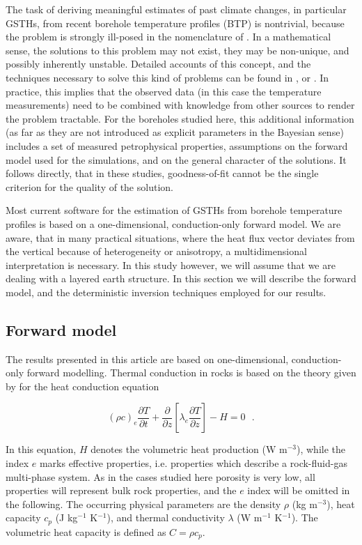\documentclass[cp]{copernicus}
\begin{document}
The task of deriving meaningful estimates of past climate changes, in particular GSTHs, from recent 
borehole temperature profiles (BTP) is nontrivial, because the problem is strongly ill-posed in the 
nomenclature of \citet{Hadamard1923a}. In a mathematical sense, the solutions to this problem may 
not exist, they may be non-unique, and possibly inherently unstable. Detailed accounts of this 
concept, and the techniques necessary to solve this kind of problems can be found in 
\citep{Hansen1998a, Hansen2010a}, or \citep{Aster2019a}. In practice, this implies that the 
observed data (in this case the temperature measurements) need to be combined with knowledge from 
other sources to render the problem tractable. For the boreholes studied here, this additional 
information (as far as they are not introduced as explicit parameters in the Bayesian sense) 
includes a set of measured petrophysical properties, assumptions on the forward model used for the 
simulations, and on the general character of the solutions. It follows directly, that in these 
studies, goodness-of-fit cannot be the single criterion for the quality of the solution. 

Most current software for the estimation of GSTHs from borehole temperature profiles is based on a 
one-dimensional, conduction-only forward model. We are aware, that in many practical situations, 
where the heat flux vector deviates from the vertical because of heterogeneity or anisotropy, a 
multidimensional interpretation is necessary. In this study however, we will assume that we are 
dealing with a layered earth structure. In this section we will describe the forward model, and the 
deterministic inversion techniques employed for our results.


\subsection{Forward model}
\label{sec:fwd}
The results presented in this article are based on one-dimensional, conduction-only forward 
modelling. Thermal conduction in rocks is based on the theory given by \citet{Carslaw1959a} for 
the heat conduction equation 

\begin{equation}\label{eqn:1}
 {\left( {\rho c} \right)_e}\frac{{\partial T}}{{\partial t}} + \frac{\partial 
}{{\partial z}}\left[ {{\lambda _e}\frac{{\partial T}}{{\partial z}}} \right] - 
H = 0{\text{ }.}
\end{equation} 

In this equation, $H$ denotes the volumetric heat production (W m$^{-3}$), while the index $e$ 
marks effective properties, i.e. properties which describe a rock-fluid-gas multi-phase system. As 
in the cases studied here porosity is very low, all properties will represent bulk rock properties, 
and the $e$ index will be omitted in the following. The occurring physical parameters are the 
density $\rho$ (kg m$^{-3}$), heat capacity $c_p$ (J kg$^{-1}$ K$^{-1}$), and thermal conductivity 
$\lambda$ (W m$^{-1}$ K$^{-1}$). The volumetric heat capacity is defined as $C = \rho c_p$. 
\end{document}
